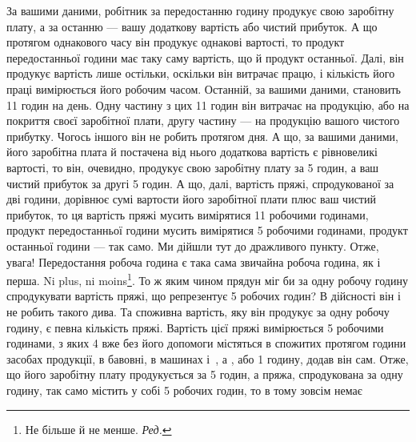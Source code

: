 \enlargethispage{\baselineskip}
За вашими даними, робітник за передостанню годину продукує свою заробітну плату, а за останню — вашу
додаткову вартість або чистий прибуток. А що протягом однакового часу він продукує
однакові вартості, то продукт передостанньої години має таку
саму вартість, що й продукт останньої. Далі, він продукує вартість лише остільки, оскільки він
витрачає працю, і кількість
його праці вимірюється його робочим часом. Останній, за вашими даними, становить 11 годин на
день. Одну частину з цих 11 годин
він витрачає на продукцію, або на покриття своєї заробітної плати, другу частину — на продукцію
вашого чистого прибутку. Чогось іншого він не робить протягом дня. А що, за вашими даними, його
заробітна плата й постачена від нього додаткова вартість є рівновеликі вартості, то він, очевидно,
продукує свою заробітну плату за 5 годин, а ваш чистий прибуток за другі
5 годин. А що, далі, вартість пряжі, спродукованої за дві години, дорівнює сумі вартости його
заробітної плати плюс ваш
чистий прибуток, то ця вартість пряжі мусить вимірятися 11 робочими
годинами, продукт передостанньої години мусить вимірятися 5 робочими годинами, продукт останньої
години — так
само. Ми дійшли тут до дражливого пункту. Отже, увага! Передостання робоча година є така сама
звичайна робоча година, як і
перша. Ni plus, ni moins\footnote*{
Не більше й не менше. \emph{Ред.}
}. То ж яким чином прядун міг би за одну робочу годину спродукувати
вартість пряжі, що репрезентує 5 робочих годин? В дійсності він і не робить такого дива. Та
споживна вартість, яку він продукує за одну робочу годину, є певна кількість пряжі. Вартість цієї
пряжі вимірюється 5 робочими годинами, з яких 4 вже без його допомоги містяться в спожитих
протягом години засобах продукції, в бавовні, в машинах і~, а , або 1 годину, додав він
сам. Отже, що його заробітну плату продукується за 5 годин, а пряжа, спродукована за одну годину,
так само містить у собі 5 робочих годин, то в тому зовсім немає
\parbreak{}  %
